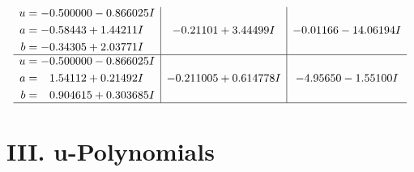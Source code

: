 \documentclass[1p]{elsarticle_modified}
\theoremstyle{definition}
\begin{document}
$$\begin{array}{c|c|c}
\begin{aligned}
u &= -0.500000 - 0.866025 I \\
a &= -0.58443 + 1.44211 I \\
b &= -0.34305 + 2.03771 I\end{aligned}
 & -0.21101 + 3.44499 I & -0.01166 - 14.06194 I \\ \hline\begin{aligned}
u &= -0.500000 - 0.866025 I \\
a &= \phantom{-}1.54112 + 0.21492 I \\
b &= \phantom{-}0.904615 + 0.303685 I\end{aligned}
 & -0.211005 + 0.614778 I & -4.95650 - 1.55100 I\\
 \hline 
 \end{array}$$\newpage
\newpage\renewcommand{\arraystretch}{1}
\centering \section*{ III. u-Polynomials}
\end{document}
